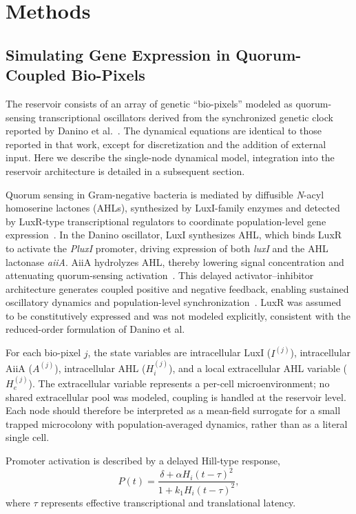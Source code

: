 \documentclass[journal=asbcd6,manuscript=article,keywords]{achemso}
\begin{document}
\section{Methods}

\subsection{Simulating Gene Expression in Quorum-Coupled Bio-Pixels}
The reservoir consists of an array of genetic “bio-pixels” modeled as quorum-sensing transcriptional oscillators derived from the synchronized genetic clock reported by Danino et al.~\cite{Danino2010}. 
The dynamical equations are identical to those reported in that work, except for discretization and the addition of external input. 
Here we describe the single-node dynamical model, integration into the reservoir architecture is detailed in a subsequent section.

Quorum sensing in Gram-negative bacteria is mediated by diffusible \textit{N}-acyl homoserine lactones (AHLs), synthesized by LuxI-family enzymes and detected by LuxR-type transcriptional regulators to coordinate population-level gene expression~\cite{Fuqua2002}. 
In the Danino oscillator, LuxI synthesizes AHL, which binds LuxR to activate the \textit{PluxI} promoter, driving expression of both \textit{luxI} and the AHL lactonase \textit{aiiA}. AiiA hydrolyzes AHL, thereby lowering signal concentration and attenuating quorum-sensing activation~\cite{Dong2000}. 
This delayed activator--inhibitor architecture generates coupled positive and negative feedback, enabling sustained oscillatory dynamics and population-level synchronization~\cite{Danino2010}. 
LuxR was assumed to be constitutively expressed and was not modeled explicitly, consistent with the reduced-order formulation of Danino et al.

For each bio-pixel $j$, the state variables are intracellular LuxI ($I^{(j)}$), intracellular AiiA ($A^{(j)}$), intracellular AHL ($H_i^{(j)}$), and a local extracellular AHL variable ($H_e^{(j)}$). 
The extracellular variable represents a per-cell microenvironment; no shared extracellular pool was modeled, coupling is handled at the reservoir level. 
Each node should therefore be interpreted as a mean-field surrogate for a small trapped microcolony with population-averaged dynamics, rather than as a literal single cell.

Promoter activation is described by a delayed Hill-type response,
\begin{equation}
    P(t) =
    \frac{\delta + \alpha H_i(t-\tau)^2}
    {1 + k_1 H_i(t-\tau)^2},
\end{equation}
where $\tau$ represents effective transcriptional and translational latency.
\end{document}
